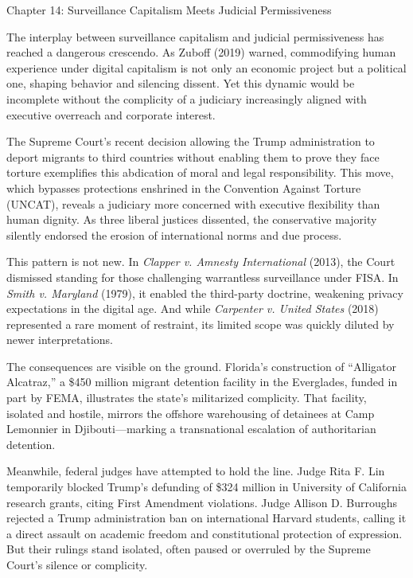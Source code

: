 \documentclass[
]{article}
\author{}
\date{}
\begin{document}
Chapter 14: Surveillance Capitalism Meets Judicial Permissiveness

The interplay between surveillance capitalism and judicial permissiveness has reached a dangerous crescendo. As Zuboff (2019) warned, commodifying human experience under digital capitalism is not only an economic project but a political one, shaping behavior and silencing dissent. Yet this dynamic would be incomplete without the complicity of a judiciary increasingly aligned with executive overreach and corporate interest.

The Supreme Court's recent decision allowing the Trump administration to deport migrants to third countries without enabling them to prove they face torture exemplifies this abdication of moral and legal responsibility. This move, which bypasses protections enshrined in the Convention Against Torture (UNCAT), reveals a judiciary more concerned with executive flexibility than human dignity. As three liberal justices dissented, the conservative majority silently endorsed the erosion of international norms and due process.

This pattern is not new. In \emph{Clapper v. Amnesty International} (2013), the Court dismissed standing for those challenging warrantless surveillance under FISA. In \emph{Smith v. Maryland} (1979), it enabled the third-party doctrine, weakening privacy expectations in the digital age. And while \emph{Carpenter v. United States} (2018) represented a rare moment of restraint, its limited scope was quickly diluted by newer interpretations.

The consequences are visible on the ground. Florida's construction of ``Alligator Alcatraz,'' a \$450 million migrant detention facility in the Everglades, funded in part by FEMA, illustrates the state's militarized complicity. That facility, isolated and hostile, mirrors the offshore warehousing of detainees at Camp Lemonnier in Djibouti---marking a transnational escalation of authoritarian detention.

Meanwhile, federal judges have attempted to hold the line. Judge Rita F. Lin temporarily blocked Trump's defunding of \$324 million in University of California research grants, citing First Amendment violations. Judge Allison D. Burroughs rejected a Trump administration ban on international Harvard students, calling it a direct assault on academic freedom and constitutional protection of expression. But their rulings stand isolated, often paused or overruled by the Supreme Court's silence or complicity.
\end{document}
